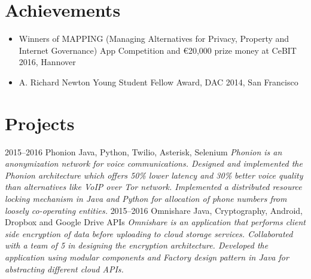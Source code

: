 \documentclass[]{friggeri-cv}
\begin{document}
\vspace{0.3cm}

\section{Achievements}
\begin{itemize}
    \item Winners of MAPPING (Managing Alternatives for Privacy, Property and Internet Governance) App Competition and \euro 20,000 prize money at CeBIT 2016, Hannover
    \item A. Richard Newton Young Student Fellow Award, DAC 2014, San Francisco
\end{itemize}
\vspace{0.3cm}

\section{Projects}
    \begin{entrylist}
        \entry
            {2015–2016}
            {Phonion}
            {Java, Python, Twilio, Asterisk, Selenium}
            {\emph{Phonion is an anonymization network for voice communications. Designed and implemented the Phonion architecture which offers 50\% lower latency and 30\% better voice quality than alternatives like VoIP over Tor network. Implemented a distributed resource locking mechanism in Java and Python for allocation of phone numbers from loosely co-operating entities.}}
        \entry
            {2015–2016}
            {Omnishare}
            {Java, Cryptography, Android, Dropbox and Google Drive APIs}
            {\emph{Omnishare is an application that performs client side encryption of data before uploading to cloud storage services. Collaborated with a team of 5 in designing the encryption architecture. Developed the application using modular components and Factory design pattern in Java for abstracting different cloud APIs.}}
    \end{entrylist}
\end{document}
